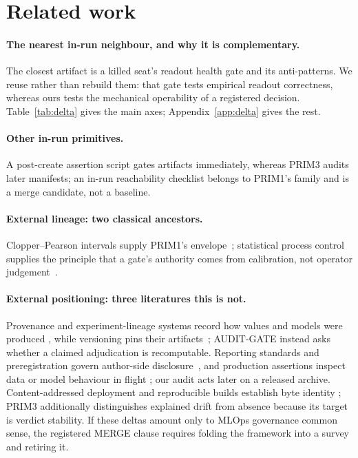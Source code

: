 \documentclass{article}
\begin{document}
\section{Related work}
\label{sec:related}

\paragraph{The nearest in-run neighbour, and why it is complementary.}
The closest artifact is a killed seat's readout health gate and its anti-patterns. We reuse
rather than rebuild them: that gate tests empirical readout correctness, whereas ours tests
the mechanical operability of a registered decision. Table~\ref{tab:delta} gives the main
axes; Appendix~\ref{app:delta} gives the rest.

\paragraph{Other in-run primitives.}
A post-create assertion script gates artifacts immediately, whereas PRIM3 audits later
manifests; an in-run reachability checklist belongs to PRIM1's family and is a merge
candidate, not a baseline.

\paragraph{External lineage: two classical ancestors.}
Clopper--Pearson intervals supply PRIM1's envelope~\citep{clopper1934use}; statistical
process control supplies the principle that a gate's authority comes from calibration, not
operator judgement~\citep{shewhart1931economic}.

\paragraph{External positioning: three literatures this is not.}
Provenance and experiment-lineage systems record how values and models were produced
\citep{cheney2009provenance,vartak2016modeldb,schelter2017automatically,zaharia2018accelerating},
while versioning pins their artifacts~\citep{kuprieiev2020dvc}; AUDIT-GATE instead asks
whether a claimed adjudication is recomputable. Reporting standards and preregistration
govern author-side disclosure~\citep{pineau2021improving,gebru2021datasheets,forde2019scientific},
and production assertions inspect data or model behaviour in flight
\citep{polyzotis2019data,kang2020model}; our audit acts later on a released archive.
Content-addressed deployment and reproducible builds establish byte identity
\citep{dolstra2004nix,lamb2022reproducible}; PRIM3 additionally distinguishes explained drift
from absence because its target is verdict stability. If these deltas amount only to MLOps
governance common sense, the registered MERGE clause requires folding the framework into a
survey and retiring it.
\end{document}
